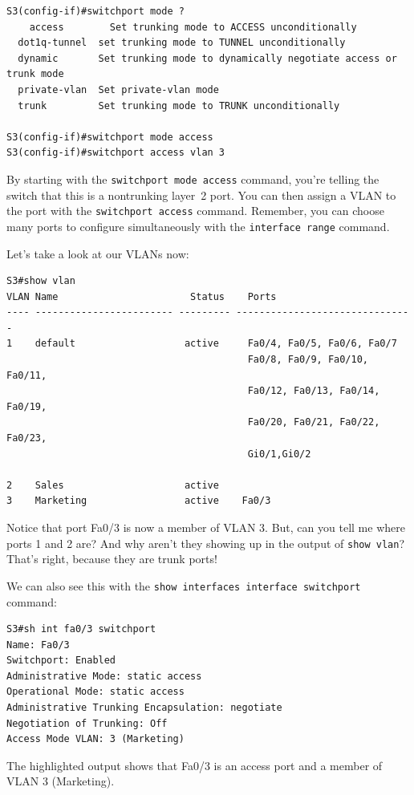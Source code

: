 \documentclass[b5paper,11pt]{memoir}
\begin{document}
\begin{verbatim}
S3(config-if)#switchport mode ?
    access        Set trunking mode to ACCESS unconditionally
  dot1q-tunnel  set trunking mode to TUNNEL unconditionally
  dynamic       Set trunking mode to dynamically negotiate access or trunk mode
  private-vlan  Set private-vlan mode
  trunk         Set trunking mode to TRUNK unconditionally
 
S3(config-if)#switchport mode access
S3(config-if)#switchport access vlan 3
\end{verbatim}

By starting with the \texttt{switchport\ mode\ access} command, you're
telling the switch that this is a nontrunking layer~2 port. You can then
assign a VLAN to the port with the \texttt{switchport\ access} command.
Remember, you can choose many ports to configure simultaneously with the
\texttt{interface\ range} command.

Let's take a look at our VLANs now:

\begin{verbatim}
S3#show vlan
VLAN Name                       Status    Ports
---- ------------------------ --------- -------------------------------
1    default                   active     Fa0/4, Fa0/5, Fa0/6, Fa0/7
                                          Fa0/8, Fa0/9, Fa0/10, Fa0/11,
                                          Fa0/12, Fa0/13, Fa0/14, Fa0/19,
                                          Fa0/20, Fa0/21, Fa0/22, Fa0/23,
                                          Gi0/1,Gi0/2
 
2    Sales                     active
3    Marketing                 active    Fa0/3
\end{verbatim}

Notice that port Fa0/3 is now a member of VLAN 3. But, can you tell me where ports 1 and
2 are? And why aren't they showing up in the output of
\texttt{show\ vlan}? That's right, because they are trunk ports!

We can also see this with the
\texttt{show\ interfaces\ interface\ switchport} command:

\begin{verbatim}
S3#sh int fa0/3 switchport
Name: Fa0/3
Switchport: Enabled
Administrative Mode: static access
Operational Mode: static access
Administrative Trunking Encapsulation: negotiate
Negotiation of Trunking: Off
Access Mode VLAN: 3 (Marketing)
\end{verbatim}

The highlighted output shows that Fa0/3 is an access port and a member
of VLAN 3 (Marketing).
\end{document}
